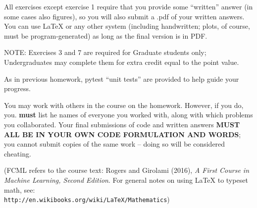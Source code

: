 \documentclass[10pt]{article}
\newcommand{\latex}{\LaTeX\xspace}
\begin{document}
All exercises except exercise 1 require that you provide some ``written'' answer (in some cases also figures), so you will also submit a .pdf of your written answers.  You can use \latex or any other system (including handwritten; plots, of course, must be program-generated) as long as the final version is in PDF.

NOTE: Exercises 3 and 7 are required for Graduate students only; Undergraduates may complete them for extra credit equal to the point value.

As in previous homework, pytest ``unit tests'' are provided to help guide your progress.

You may work with others in the course on the homework. However, if you do, you. {\bf must} list he names of everyone you worked with, along with which problems you collaborated. Your final submissions of code and written answers {\bf MUST ALL BE IN YOUR OWN CODE FORMULATION AND WORDS}; you cannot submit copies of the same work -- doing so will be considered cheating.

(FCML refers to the course text: Rogers and Girolami (2016), {\em A First Course in Machine Learning, Second Edition}.  For general notes on using \latex to typeset math, see:\\ {\tt http://en.wikibooks.org/wiki/LaTeX/Mathematics})
\vspace{.5cm}

\end{document}
